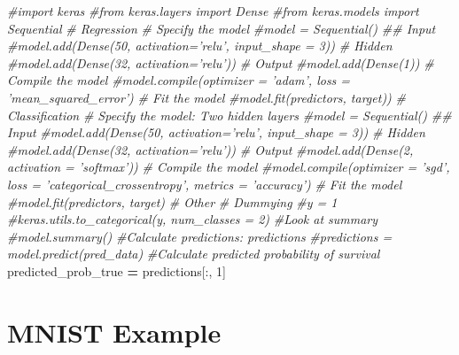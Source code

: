 \documentclass[]{book}
\newenvironment{Shaded}{\begin{snugshade}}{\end{snugshade}}
\newcommand{\CommentTok}[1]{\textcolor[rgb]{0.56,0.35,0.01}{\textit{#1}}}
\newcommand{\DecValTok}[1]{\textcolor[rgb]{0.00,0.00,0.81}{#1}}
\newcommand{\NormalTok}[1]{#1}
\newcommand{\OperatorTok}[1]{\textcolor[rgb]{0.81,0.36,0.00}{\textbf{#1}}}
\begin{document}
\begin{Shaded}
\begin{Highlighting}[]
\CommentTok{#import keras}
\CommentTok{#from keras.layers import Dense}
\CommentTok{#from keras.models import Sequential}
\CommentTok{# Regression}
\CommentTok{# Specify the model}
\CommentTok{#model = Sequential()}
\CommentTok{## Input}
\CommentTok{#model.add(Dense(50, activation='relu', input_shape = 3))}
\CommentTok{# Hidden}
\CommentTok{#model.add(Dense(32, activation='relu'))}
\CommentTok{# Output}
\CommentTok{#model.add(Dense(1))}
\CommentTok{# Compile the model}
\CommentTok{#model.compile(optimizer = 'adam', loss = 'mean_squared_error') }
\CommentTok{# Fit the model}
\CommentTok{#model.fit(predictors, target))}
\CommentTok{# Classification}
\CommentTok{# Specify the model: Two hidden layers}
\CommentTok{#model = Sequential()}
\CommentTok{## Input}
\CommentTok{#model.add(Dense(50, activation='relu', input_shape = 3))}
\CommentTok{# Hidden}
\CommentTok{#model.add(Dense(32, activation='relu'))}
\CommentTok{# Output}
\CommentTok{#model.add(Dense(2, activation = 'softmax'))}
\CommentTok{# Compile the model}
\CommentTok{#model.compile(optimizer = 'sgd', loss = 'categorical_crossentropy', metrics = 'accuracy')}
\CommentTok{# Fit the model}
\CommentTok{#model.fit(predictors, target)}
\CommentTok{# Other}
\CommentTok{# Dummying}
\CommentTok{#y = 1}
\CommentTok{#keras.utils.to_categorical(y, num_classes = 2)}
\CommentTok{#Look at summary}
\CommentTok{#model.summary()}
\CommentTok{#Calculate predictions: predictions}
\CommentTok{#predictions = model.predict(pred_data)}
\CommentTok{#Calculate predicted probability of survival}
\NormalTok{predicted_prob_true }\OperatorTok{=}\NormalTok{ predictions[:, }\DecValTok{1}\NormalTok{]}
\end{Highlighting}
\end{Shaded}

\hypertarget{mnist-example}{%
\section{MNIST Example}\label{mnist-example}}
\end{document}
